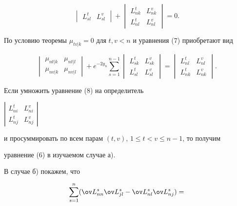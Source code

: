 \begin{pf}
\begin{equation}
\begin{vmatrix}
L^t_{sl} & L^v_{sl} \end{vmatrix}


+\begin{vmatrix} L^t_{nk} & L^v_{nk} \\ L^t_{nl} & L^v_{nl} \end{vmatrix}=0.


\end{equation}





По условию теоремы $\mu_{tv|k}=0$ для $t,v<n$ и уравнения (7) приобретают вид 


\begin{equation}


\begin{vmatrix} \mu_{nt|k} & \mu_{nt|l} \\ \mu_{nv|k} & \mu_{nv|l}


\end{vmatrix}+ e^{-2y_n} \sum_{s=1}^{n-1}


\begin{vmatrix} L^t_{sk} & L^v_{sk} \\ L^t_{sl} & L^v_{sl} \end{vmatrix}


=\begin{vmatrix} L^t_{nl} & L^v_{nl} \\ L^t_{nk} & L^v_{nk} \end{vmatrix}.


\end{equation}





Если умножить уравнение (8) на определитель


$\left| \begin{smallmatrix}L^t_{ni} & L^v_{ni} \\ L^t_{nj} & L^v_{nj}


\end{smallmatrix}\right |$


и просуммировать по всем парам $(t,v)$, $1 \leq t<v \leq n-1$, то получим 


уравнение (6) в изучаемом случае а). 





В случае б) покажем, что


\begin{equation}


\sum_{s=1}^n (\ov L{}^s_{nn}\ov L{}^s_{jl}-\ov L{}^s_{nl}\ov L{}^s_{nj})=



\end{equation}
\end{pf}
